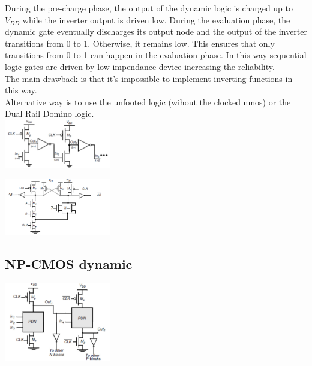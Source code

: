 During the pre-charge phase, the output of the dynamic logic is charged up to $V_{DD}$ while the inverter output is driven low. During the evaluation phase, the dynamic gate eventually discharges its output node and the output of the inverter transitions from 0 to 1. Otherwise, it remains low. This ensures that only transitions from 0 to 1 can happen in the evaluation phase.
In this way sequential logic gates are driven by low impendance device increasing the reliability.\\
The main drawback is that it's impossible to implement inverting functions in this way.\\
\vspace{5mm}
Alternative way is to use the unfooted logic (wihout the clocked nmos) or the Dual Rail Domino logic.\\

\centering
\includegraphics[width=0.35\textwidth]{C9_8.png}\\
\raggedright

\centering
\includegraphics[width=0.35\textwidth]{C9_9.png}\\
\raggedright



\subsection{NP-CMOS dynamic}

\centering
\includegraphics[width=0.35\textwidth]{C9_10.png}\\
\raggedright

